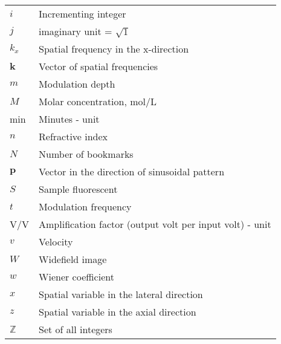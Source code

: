 \begin{flushleft}
\begin{longtable}[l]{|R{5.5em}|p{25em}|}
$i$               & Incrementing integer                              \\
$j$               & imaginary unit = $\sqrt{1}$                       \\
$k_x$             & Spatial frequency in the x-direction              \\
$\mathbf{k}$      & Vector of spatial frequencies                                 \\
$m$               & Modulation depth                                  \\
$M$               & Molar concentration, mol/L                        \\
min		          & Minutes - unit                                            \\
$n$               & Refractive index                                  \\
$N$               & Number of bookmarks                               \\
$\mathbf{p}$      & Vector in the direction of sinusoidal pattern    \\
$S$               & Sample fluorescent                                \\
$t$               & Modulation frequency                              \\
V/V 		      & Amplification factor (output volt per input volt) - unit \\
$v$               & Velocity                                          \\
$W$               & Widefield image                                   \\
$w$               & Wiener coefficient                                \\
$x$               & Spatial variable in the lateral direction         \\
$z$               & Spatial variable in the axial direction           \\
$\mathbb{Z}$      & Set of all integers                                           \\
\hline
\end{longtable}
\end{flushleft}